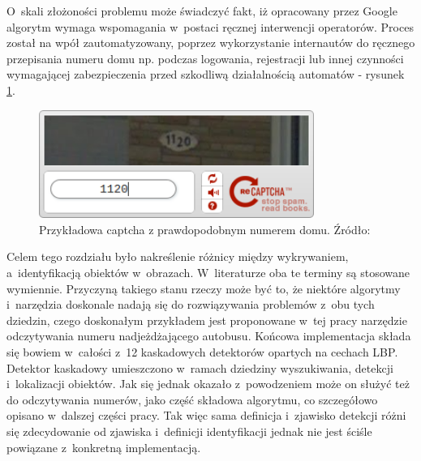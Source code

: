 O~skali złożoności problemu może świadczyć fakt, iż
opracowany przez Google algorytm wymaga wspomagania w~postaci
ręcznej interwencji
operatorów. Proces został na wpół zautomatyzowany, 
poprzez wykorzystanie internautów do ręcznego
przepisania numeru domu np. podczas logowania, rejestracji lub innej
czynności wymagającej zabezpieczenia przed szkodliwą działalnością
automatów - rysunek \ref{fig:google_street_view_captcha}.

\begin{figure}[h!]
	\centering
	\includegraphics[width=0.8\textwidth]{img/rev_captcha_street_view}
	\caption{Przykładowa captcha z prawdopodobnym numerem domu. Źródło: 
		\cite{TC:google_street_view_recaptcha}}
	\label{fig:google_street_view_captcha}
\end{figure}

Celem tego rozdziału było nakreślenie różnicy między wykrywaniem, a~identyfikacją
obiektów w~obrazach. W~literaturze oba te terminy są stosowane wymiennie. Przyczyną
takiego stanu rzeczy może być to, że niektóre algorytmy i~narzędzia
doskonale nadają się do rozwiązywania problemów z~obu tych dziedzin, 
czego doskonałym przykładem jest proponowane w~tej pracy narzędzie
odczytywania numeru nadjeżdżającego autobusu. Końcowa implementacja 
składa się bowiem w~całości z~12 kaskadowych detektorów opartych
na cechach LBP. Detektor kaskadowy umieszczono w~ramach dziedziny
wyszukiwania, detekcji i~lokalizacji obiektów. Jak się jednak okazało 
z~powodzeniem może on służyć też do odczytywania numerów, jako część
składowa algorytmu, co szczegółowo opisano w~dalszej części pracy.
Tak więc sama definicja i~zjawisko detekcji różni się zdecydowanie od 
zjawiska i~definicji identyfikacji
jednak nie jest ściśle powiązane z~konkretną implementacją.